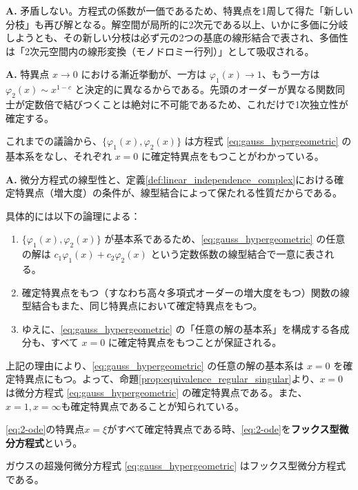 \begin{Q}
\textbf{A.} 矛盾しない。方程式の係数が一価であるため、特異点を1周して得た「新しい分枝」も再び解となる。解空間が局所的に2次元である以上、いかに多価に分岐しようとも、その新しい分枝は必ず元の2つの基底の線形結合で表され、多価性は「2次元空間内の線形変換（モノドロミー行列）」として吸収される。
\end{Q}

\begin{Q}
\textbf{A.} 特異点 $x \to 0$ における漸近挙動が、一方は $\varphi_1(x) \to 1$、もう一方は $\varphi_2(x) \sim x^{1-c}$ と決定的に異なるからである。先頭のオーダーが異なる関数同士が定数倍で結びつくことは絶対に不可能であるため、これだけで1次独立性が確定する。
\end{Q}
これまでの議論から、$\{\varphi_{1}(x), \varphi_{2}(x)\}$ は方程式 \eqref{eq:gauss_hypergeometric} の基本系をなし、それぞれ $x=0$ に確定特異点をもつことがわかっている。

\begin{Q}[命題\ref{prop:equivalence_regular_singular}を適用するには「\textbf{任意の}解の基本系」が $x=0$ に確定特異点をもつことを示す必要がある。なぜ特定の基本系 $\{\varphi_{1}(x), \varphi_{2}(x)\}$ の性質から「任意」へと議論を拡張できるのか？]
\textbf{A.} 微分方程式の線型性と、定義\ref{def:linear_independence_complex}における確定特異点（増大度）の条件が、線型結合によって保たれる性質だからである。

具体的には以下の論理による：
\begin{enumerate}
    \item $\{\varphi_{1}(x), \varphi_{2}(x)\}$ が基本系であるため、\eqref{eq:gauss_hypergeometric} の任意の解は $c_{1}\varphi_{1}(x) + c_{2}\varphi_{2}(x)$ という定数係数の線型結合で一意に表される。
    \item 確定特異点をもつ（すなわち高々多項式オーダーの増大度をもつ）関数の線型結合もまた、同じ特異点において確定特異点をもつ。
    \item ゆえに、\eqref{eq:gauss_hypergeometric} の「任意の解の基本系」を構成する各成分も、すべて $x=0$ に確定特異点をもつことが保証される。
\end{enumerate}
\end{Q}

上記の理由により、\eqref{eq:gauss_hypergeometric} の任意の解の基本系は $x=0$ を確定特異点にもつ。よって、命題\ref{prop:equivalence_regular_singular}より、$x=0$ は微分方程式 \eqref{eq:gauss_hypergeometric} の確定特異点である。また、$x=1,x=\infty$も確定特異点であることが知られている。
\begin{definition}
    \eqref{eq:2-ode}の特異点$x=\xi$がすべて確定特異点である時、\eqref{eq:2-ode}を\textbf{フックス型微分方程式}という。
\end{definition}
\begin{example}
    ガウスの超幾何微分方程式 \eqref{eq:gauss_hypergeometric} はフックス型微分方程式である。
\end{example}

